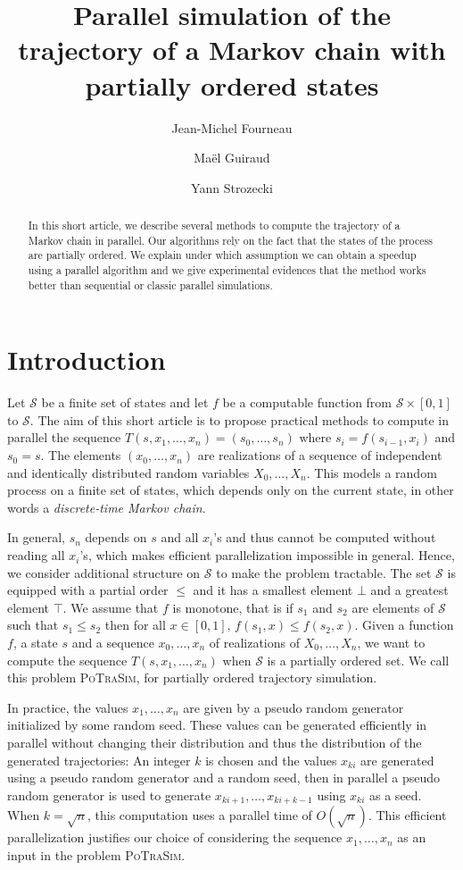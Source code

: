 \documentclass[a4paper,10pt]{article}
\title{Parallel simulation of the trajectory of a Markov chain with partially ordered states}
\author{Jean-Michel Fourneau \and Maël Guiraud \and Yann Strozecki}
\newcommand{\cS}{\mathcal{S}}
\begin{document}
\maketitle

\begin{abstract}
In this short article, we describe several methods to compute the trajectory of a Markov chain in parallel. 
Our algorithms rely on the fact that the states of the process are partially ordered. We explain under which assumption we can 
obtain a speedup using a parallel algorithm and we give experimental evidences that the method works better than sequential or classic parallel simulations.
\end{abstract}

\section{Introduction} %

Let $\cS$ be a finite set of states and let $f$ be a computable function from $\cS \times [0,1]$ to $\cS$. 
The aim of this short article is to propose practical methods to compute in parallel the sequence $T(s,x_1,\dots,x_n)= (s_0, \dots, s_n)$ where $s_i = f(s_{i-1},x_i)$ and $s_0 = s$. The elements $(x_0,\dots,x_n)$ are realizations of a sequence of independent and identically distributed random variables $X_0,\dots,X_n$. This models a random process on a finite set of states, which depends only on the current state, in other words a \emph{discrete-time Markov chain}.

In general,  $s_n$ depends on $s$ and all $x_i$'s and thus cannot be computed without reading all $x_i$'s,
which makes efficient parallelization impossible in general. Hence, we consider additional structure on $\cS$ to make the problem tractable. The set $\cS$ is equipped with a partial order $\leq$ and it has a smallest element $\bot$ and a greatest element $ \top$. We assume that $f$ is monotone, that is if $s_1$ and $s_2$ are elements of $\cS$ such that $s_1 \leq s_2$ then for all $x\in[0,1],\, f(s_1, x) \leq f(s_2, x)$. Given a function $f$, a state $s$ and a sequence $x_0,\dots,x_n$ of realizations of $X_0,\dots,X_n$, we want to compute the sequence $T(s,x_1,\dots,x_n)$ when $\cS$ is a partially ordered set. We call this problem \textsc{PoTraSim}, for partially ordered trajectory simulation.  

In practice, the values $x_1,\dots,x_n$ are given by a pseudo random generator initialized by some random seed.
These values can be generated efficiently in parallel without changing their distribution and thus the distribution of the generated 
trajectories: An integer $k$ is chosen and the values $x_{ki}$ are generated using a pseudo random generator and a random seed, then in parallel a pseudo random generator is used to generate $x_{ki +1},\dots, x_{ki + k - 1}$ using $x_{ki}$ as a seed. When $ k = \sqrt{n}$, this computation uses a parallel time of $O(\sqrt{n})$. This efficient parallelization justifies our choice of considering the sequence $x_1,\dots,x_n$ as an input in the problem \textsc{PoTraSim}.
\end{document}
